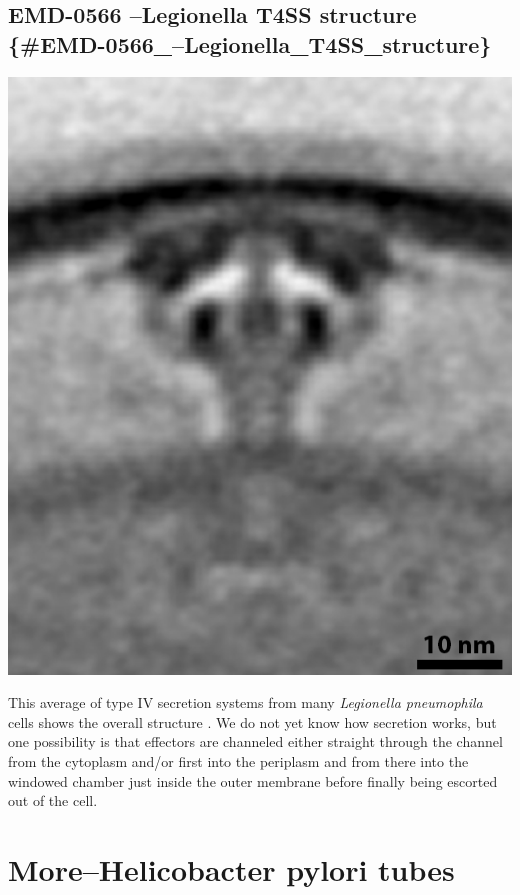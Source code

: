 \documentclass[]{tufte-book}
\begin{document}
\subsection{EMD-0566 --Legionella T4SS structure
\{\#EMD-0566\_--Legionella\_T4SS\_structure\}}\label{emd-0566-legionella-t4ss-structure-emd-0566_legionella_t4ss_structure}

\includegraphics{img/schematics/9_3_2}

This average of type IV secretion systems from many \emph{Legionella
pneumophila} cells shows the overall structure \citet{ghosal2019a}. We
do not yet know how secretion works, but one possibility is that
effectors are channeled either straight through the channel from the
cytoplasm and/or first into the periplasm and from there into the
windowed chamber just inside the outer membrane before finally being
escorted out of the cell.

\hypertarget{morehelicobacter-pylori-tubes}{\section{More--Helicobacter
pylori tubes}\label{morehelicobacter-pylori-tubes}}
\end{document}
